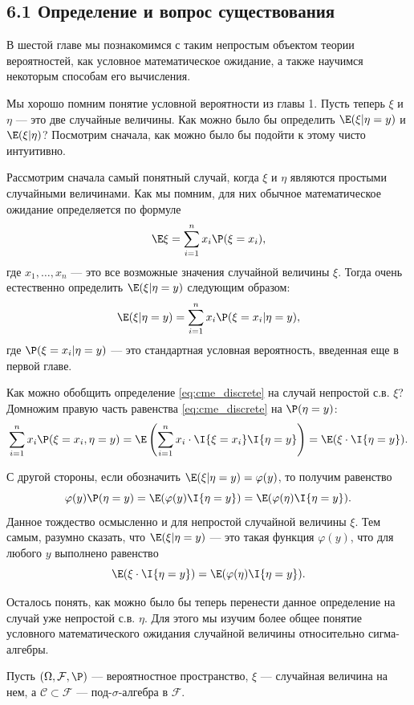 \subsection*{6.1 Определение и вопрос существования}

В шестой главе мы познакомимся с таким непростым объектом теории вероятностей, как условное математическое ожидание, а также научимся некоторым способам его вычисления.

Мы хорошо помним понятие условной вероятности из главы 1. Пусть теперь $\xi$ и $\eta$ --- это две случайные величины. Как можно было бы определить $\E(\xi|\eta = y)$ и $\E(\xi|\eta)$? Посмотрим сначала, как можно было бы подойти к этому чисто интуитивно.

Рассмотрим сначала самый понятный случай, когда $\xi$ и $\eta$ являются простыми случайными величинами. Как мы помним, для них обычное математическое ожидание определяется по формуле
$$ \E\xi = \sum_{i=1}^n x_i\P(\xi = x_i), $$
где $x_1, \dots, x_n$ --- это все возможные значения случайной величины $\xi$. Тогда очень естественно определить $\E(\xi|\eta = y)$ следующим образом:
\begin{equation} \label{eq:cme_discrete}
    \E(\xi|\eta = y) = \sum_{i=1}^n x_i\P(\xi = x_i|\eta = y),
\end{equation}
где $\P(\xi = x_i|\eta = y)$ --- это стандартная условная вероятность, введенная еще в первой главе.

Как можно обобщить определение \eqref{eq:cme_discrete} на случай непростой с.в. $\xi$? Домножим правую часть равенства \eqref{eq:cme_discrete} на $\P(\eta = y)$:
$$ \sum_{i=1}^n x_i\P(\xi = x_i, \eta = y) = \E\left( \sum_{i=1}^n x_i \cdot \I\{\xi = x_i\}\I\{\eta = y\} \right) = \E(\xi \cdot \I\{\eta = y\}). $$

С другой стороны, если обозначить $\E(\xi|\eta = y) = \varphi(y)$, то получим равенство
$$ \varphi(y)\P(\eta = y) = \E(\varphi(y)\I\{\eta = y\}) = \E(\varphi(\eta)\I\{\eta = y\}). $$
Данное тождество осмысленно и для непростой случайной величины $\xi$. Тем самым, разумно сказать, что $\E(\xi|\eta = y)$ --- это такая функция $\varphi(y)$, что для любого $y$ выполнено равенство
$$ \E(\xi \cdot \I\{\eta = y\}) = \E(\varphi(\eta)\I\{\eta = y\}). $$

Осталось понять, как можно было бы теперь перенести данное определение на случай уже непростой с.в. $\eta$. Для этого мы изучим более общее понятие условного математического ожидания случайной величины относительно сигма-алгебры.

Пусть $(\Omega, \mathcal{F}, \P)$ --- вероятностное пространство, $\xi$ --- случайная величина на нем, а $\mathcal{C} \subset \mathcal{F}$ --- под-$\sigma$-алгебра в $\mathcal{F}$.

